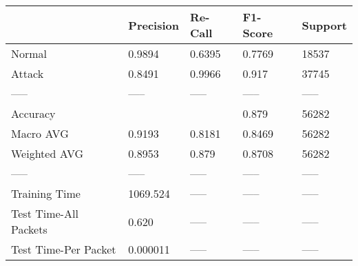\begin{tabular}{lllll}
\toprule
{} & Precision & Re-Call & F1-Score & Support \\
\midrule
Normal                &    0.9894 &  0.6395 &   0.7769 &   18537 \\
Attack                &    0.8491 &  0.9966 &    0.917 &   37745 \\
-----                 &     ----- &   ----- &    ----- &   ----- \\
Accuracy              &           &         &    0.879 &   56282 \\
Macro AVG             &    0.9193 &  0.8181 &   0.8469 &   56282 \\
Weighted AVG          &    0.8953 &   0.879 &   0.8708 &   56282 \\
-----                 &     ----- &   ----- &    ----- &   ----- \\
Training Time         &  1069.524 &   ----- &    ----- &   ----- \\
Test Time-All Packets &     0.620 &   ----- &    ----- &   ----- \\
Test Time-Per Packet  &  0.000011 &   ----- &    ----- &   ----- \\
\bottomrule
\end{tabular}
